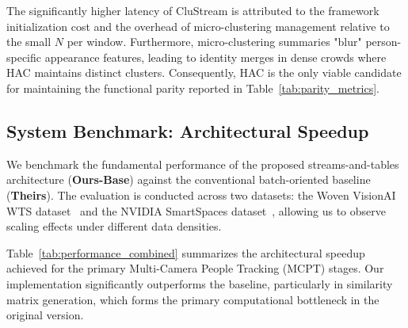 \documentclass[11pt]{article}
\begin{document}
The significantly higher latency of CluStream is attributed to the framework initialization cost and the overhead of micro-clustering management relative to the small $N$ per window. Furthermore, micro-clustering summaries "blur" person-specific appearance features, leading to identity merges in dense crowds where HAC maintains distinct clusters. Consequently, HAC is the only viable candidate for maintaining the functional parity reported in Table~\ref{tab:parity_metrics}.

\subsection{System Benchmark: Architectural Speedup}

We benchmark the fundamental performance of the proposed streams-and-tables architecture (\textbf{Ours-Base}) against the conventional batch-oriented baseline (\textbf{Theirs}). The evaluation is conducted across two datasets: the Woven VisionAI WTS dataset~\cite{woven2024wts} and the NVIDIA SmartSpaces dataset~\cite{aicity2025track1}, allowing us to observe scaling effects under different data densities.

Table~\ref{tab:performance_combined} summarizes the architectural speedup achieved for the primary Multi-Camera People Tracking (MCPT) stages. Our implementation significantly outperforms the baseline, particularly in similarity matrix generation, which forms the primary computational bottleneck in the original version.

\begin{table}[H]
    \centering
    \caption{Architectural Speedup (\textbf{Theirs} vs. \textbf{Ours-Base}) for Woven WTS and NVIDIA SmartSpaces Datasets (Average Latency per Window over a 50-window stress test).}
    \label{tab:performance_combined}
\end{table}
\end{document}

